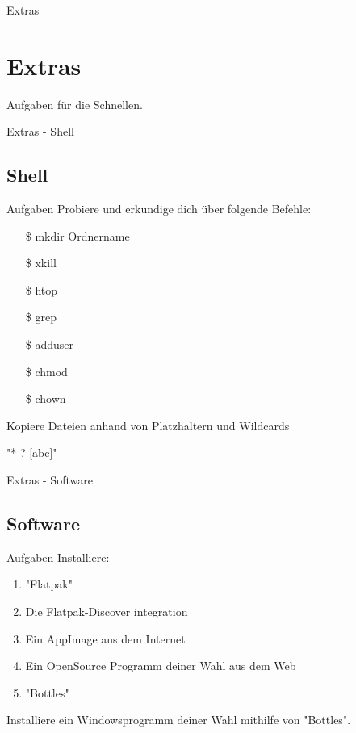 
\begin{frame}{Extras}
    \section{Extras}\label{sec:extras}

    Aufgaben für die Schnellen.
\end{frame}

\begin{frame}{Extras - Shell}
    \subsection{Shell}\label{subsec:shell}

    \begin{alertblock}{Aufgaben}
        Probiere und erkundige dich über folgende Befehle:
        \begin{enumerate}
            \item[\$] mkdir Ordnername
            \item[\$] xkill
            \item[\$] htop
            \item[\$] grep
            \item[\$] adduser
            \item[\$] chmod
            \item[\$] chown
        \end{enumerate}

        Kopiere Dateien anhand von Platzhaltern und Wildcards

        "* ? [abc]"
    \end{alertblock}

\end{frame}


\begin{frame}{Extras - Software}
    \subsection{Software}\label{subsec:software}

    \begin{alertblock}{Aufgaben}
        Installiere:
        \begin{enumerate}
            \item "Flatpak"
            \item Die Flatpak-Discover integration
            \item Ein AppImage aus dem Internet
            \item Ein OpenSource Programm deiner Wahl aus dem Web
            \item "Bottles"
        \end{enumerate}

        Installiere ein Windowsprogramm deiner Wahl mithilfe von "Bottles".
    \end{alertblock}

\end{frame}
